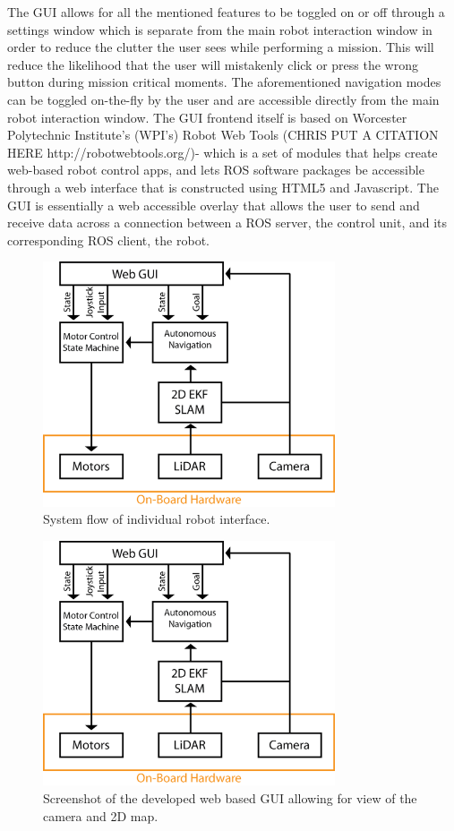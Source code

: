 The GUI allows for all the mentioned features to be toggled on or off through a settings window which is separate from the main robot interaction window in order to reduce the clutter the user sees while performing a mission. This will reduce the likelihood that the user will mistakenly click or press the wrong button during mission critical moments. The aforementioned navigation modes can be toggled on-the-fly by the user and are accessible directly from the main robot interaction window. The GUI frontend itself is based on Worcester Polytechnic Institute's (WPI's) Robot Web Tools (CHRIS PUT A CITATION HERE http://robotwebtools.org/)-  which is a set of modules that helps create web-based robot control apps, and lets ROS software packages be accessible through a web interface that is constructed using HTML5 and Javascript. The GUI is essentially a web accessible overlay that allows the user to send and receive data across a connection between a ROS server, the control unit, and its corresponding ROS client, the robot. 
 
\begin{figure}
\centering
\includegraphics[width=3.4in]{pictures/Korpela_GUI.png}
\caption{System flow of individual robot interface.}
\label{gui_flow}
\end{figure}


\begin{figure}
\centering
\includegraphics[width=3.4in]{pictures/Korpela_GUI.png}
\caption{Screenshot of the developed web based GUI allowing for view of the camera and 2D map.}
\label{gui_screenshot}
\end{figure}
